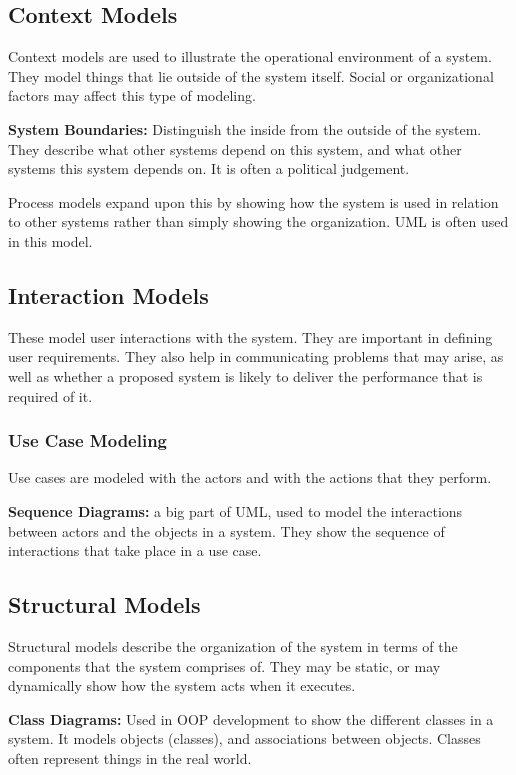 \documentclass[12pt]{article}
\begin{document}
\subsection*{Context Models}

Context models are used to illustrate the operational environment of a system. They model things that lie outside of the system itself. Social or organizational factors may affect this type of modeling.

\textbf{System Boundaries:} Distinguish the inside from the outside of the system. They describe what other systems depend on this system, and what other systems this system depends on. It is often a political judgement.

Process models expand upon this by showing how the system is used in relation to other systems rather than simply showing the organization. UML is often used in this model.

\subsection*{Interaction Models}

These model user interactions with the system. They are important in defining user requirements. They also help in communicating problems that may arise, as well as whether a proposed system is likely to deliver the performance that is required of it.

\subsubsection*{Use Case Modeling}

Use cases are modeled with the actors and with the actions that they perform.

\textbf{Sequence Diagrams:} a big part of UML, used to model the interactions between actors and the objects in a system. They show the sequence of interactions that take place in a use case.

\subsection*{Structural Models}

Structural models describe the organization of the system in terms of the components that the system comprises of. They may be static, or may dynamically show how the system acts when it executes.

\textbf{Class Diagrams:} Used in OOP development to show the different classes in a system. It models objects (classes), and associations between objects. Classes often represent things in the real world.
\end{document}
